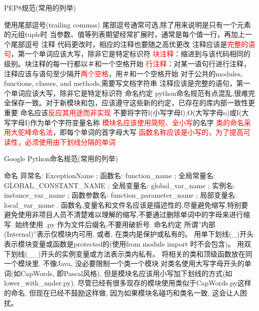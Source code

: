 \begin{frame}[fragile]{PEP8规范(常用的列举)}
    \begin{myoutline}
        \1 使用尾部逗号(trailing commas)
            \2 尾部逗号通常可选,除了用来说明是只有一个元素的元组tuple时
            \2 当参数、值等列表期望经常扩展时，通常是每个值一行，再加上一个尾部逗号
        \1 注释
            \2 代码更改时，相应的注释也要随之高优更改
            \2 注释应该是\textcolor{red}{完整的语句}，第一个单词应该大写，除非它是特定标识符
            \2 \textcolor{red}{块注释}：缩进到与该代码相同的级别。块注释的每一行都以＃和一个空格开始
            \2 \textcolor{red}{行注释}：对某一语句行进行注释，注释应该与语句至少隔开\textcolor{red}{两个空格}，用＃和一个空格开始
            \2 对于公共的modules, functions, classes, and methods,需要写文档字符串
            \2 注释应该是完整的语句，第一个单词应该大写，除非它是特定标识符
        \1 命名约定
            \2 python命名规范有点混乱,很难完全保存一致。对于新模块和包，应该遵守这些新的约定，已存在的库内部一致性更重要
            \2 命名应该\textcolor{red}{反应其用途而非实现}
            \2 不要将字符l(小写字母l),O(大写字母o)或I(大写字母I)作为单个字符变量名称
            \2 \textcolor{red}{模块名应该使用简短、全小写}的名字
            \2 \textcolor{red}{类的命名采用大驼峰命名法}，即每个单词的首字母大写
            \2 \textcolor{red}{函数名称应该是小写的，为了提高可读性，必须使用由下划线分隔的单词}
    \end{myoutline}
\end{frame}
\begin{frame}[fragile]{Google Python命名规范(常用的列举)}
    \begin{myoutline}
        \1 命名
            \2 异常名: ExceptionName ;
            \2 函数名: function\_name ;
            \2 全局常量名: GLOBAL\_CONSTANT\_NAME ;
            \2 全局变量名: global\_var\_name ;
            \2 实例名: instance\_var\_name ;
            \2 函数参数名: function\_parameter\_name ;
            \2 局部变量名: local\_var\_name .
            \2 函数名,变量名和文件名应该是描述性的,尽量避免缩写,特别要避免使用非项目人员不清楚难以理解的缩写,不要通过删除单词中的字母来进行缩写. 始终使用 .py 作为文件后缀名,不要用破折号.
        \1 命名约定
            \2 所谓”内部(Internal)”表示仅模块内可用, 或者, 在类内是保护或私有的。
            \2 用单下划线(\_)开头表示模块变量或函数是protected的(使用from module import \*时不会包含)。
            \2 用双下划线(\_\_)开头的实例变量或方法表示类内私有。
            \2 将相关的类和顶级函数放在同一个模块里. 不像Java, 没必要限制一个类一个模块.对类名使用大写字母开头的单词(如CapWords, 即Pascal风格), 但是模块名应该用小写加下划线的方式(如lower\_with\_under.py). 尽管已经有很多现存的模块使用类似于CapWords.py这样的命名, 但现在已经不鼓励这样做, 因为如果模块名碰巧和类名一致, 这会让人困扰。
    \end{myoutline}
\end{frame}

